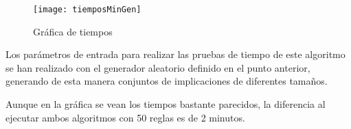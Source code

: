     \begin{figure}[H]
        \centering
        \texttt{[image: tiemposMinGen]}
        \caption{Gr\'afica de tiempos}
        \label{fig:tiemposMinGen}
    \end{figure}


    Los par\'ametros de entrada para realizar las pruebas de tiempo de este algoritmo se han realizado con el generador aleatorio definido en 
    el punto anterior, generando de esta manera conjuntos de implicaciones de diferentes tama\~nos.

    Aunque en la gr\'afica se vean los tiempos bastante parecidos, la diferencia al ejecutar ambos algoritmos con 50 reglas es de 2 minutos.